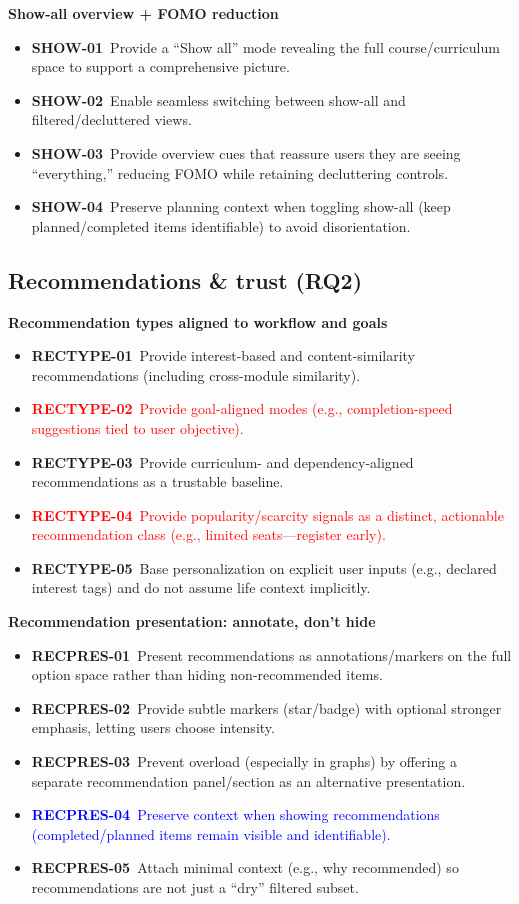 \textbf{Show-all overview + FOMO reduction}
\begin{itemize}
  \item \textbf{SHOW-01}~Provide a “Show all” mode revealing the full course/curriculum space to support a comprehensive picture.
  \item \textbf{SHOW-02}~Enable seamless switching between show-all and filtered/decluttered views.
  \item \textbf{SHOW-03}~Provide overview cues that reassure users they are seeing “everything,” reducing FOMO while retaining decluttering controls.
  \item \textbf{SHOW-04}~Preserve planning context when toggling show-all (keep planned/completed items identifiable) to avoid disorientation.
\end{itemize}


\subsection*{Recommendations \& trust (RQ2)}

\textbf{Recommendation types aligned to workflow and goals}
\begin{itemize}
  \item \textbf{RECTYPE-01}~Provide interest-based and content-similarity recommendations (including cross-module similarity).
  \item \textcolor{red}{\textbf{RECTYPE-02}~Provide goal-aligned modes (e.g., completion-speed suggestions tied to user objective).}
  \item \textbf{RECTYPE-03}~Provide curriculum- and dependency-aligned recommendations as a trustable baseline.
  \item \textcolor{red}{\textbf{RECTYPE-04}~Provide popularity/scarcity signals as a distinct, actionable recommendation class (e.g., limited seats---register early).}
  \item \textbf{RECTYPE-05}~Base personalization on explicit user inputs (e.g., declared interest tags) and do not assume life context implicitly.
\end{itemize}

\textbf{Recommendation presentation: annotate, don’t hide}
\begin{itemize}
  \item \textbf{RECPRES-01}~Present recommendations as annotations/markers on the full option space rather than hiding non-recommended items.
  \item \textbf{RECPRES-02}~Provide subtle markers (star/badge) with optional stronger emphasis, letting users choose intensity.
  \item \textbf{RECPRES-03}~Prevent overload (especially in graphs) by offering a separate recommendation panel/section as an alternative presentation.
  \item \textcolor{blue}{\textbf{RECPRES-04}~Preserve context when showing recommendations (completed/planned items remain visible and identifiable).}
  \item \textbf{RECPRES-05}~Attach minimal context (e.g., why recommended) so recommendations are not just a “dry” filtered subset.
\end{itemize}

